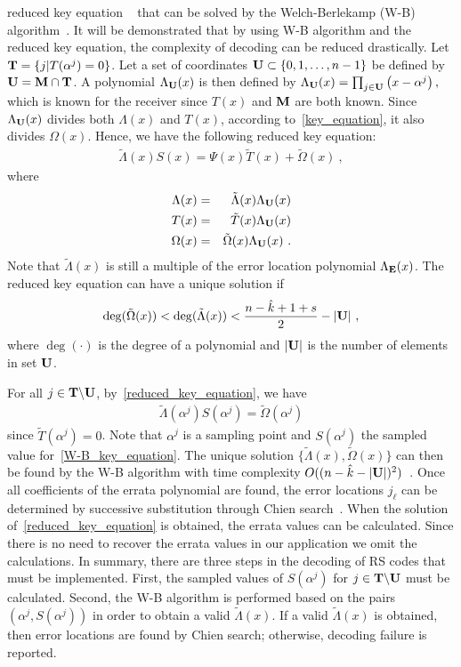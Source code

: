 \documentclass[10pt,journal,letterpaper,compsoc]{IEEEtran}
\newcommand{\0}{{\bf 0}}
\newcounter{step}
\begin{document}
reduced key equation ~\cite{ARA92} that can be solved by the Welch-Berlekamp
(W-B) algorithm~\cite{MOO05}. It will be demonstrated that by using W-B
algorithm and the reduced key equation, the complexity of decoding can be reduced drastically. Let ${\bf T}=\{j|T(\alpha^j)=0\}$.  Let a set of
coordinates ${\bf U}\subset \{0,1,\ldots,n-1\}$ be defined by ${\bf U} ={\bf M}\cap {\bf T}$. A polynomial $\Lambda_{{\bf U}}(x)$ is then defined by
$\Lambda_{{\bf U}}(x)=\prod_{j\in {\bf U}}\left(x-\alpha^j\right),$ which is known for the
receiver since $T(x)$ and ${\bf M}$ are both known. Since $\Lambda_{\bf U}(x)$
divides both $\Lambda(x)$ and $T(x)$, according to~\eqref{key_equation}, it
also divides $\Omega(x)$. Hence, we have the following reduced key equation:
\begin{eqnarray}
\tilde\Lambda(x)S(x)=\Psi(x)\tilde{T}(x)+\tilde\Omega(x)~,\label{reduced_key_equation}
\end{eqnarray}
where
\begin{eqnarray*}
\Lambda(x)&=&\tilde\Lambda(x)\Lambda_{{\bf U}}(x)\\
T(x)&=&\tilde{T}(x)\Lambda_{{\bf U}}(x)\\
\Omega(x)&=&\tilde\Omega(x)\Lambda_{{\bf U}}(x)~.
\end{eqnarray*}
Note that $\tilde\Lambda(x)$ is still a multiple of the error location polynomial $\Lambda_{{\bf E}}(x)$. The reduced key equation can have a unique solution if
\begin{eqnarray}
\deg(\tilde\Omega(x))<\deg(\tilde\Lambda(x))<\frac{n-\hat{k}+1+s}{2}-|{\bf U}|~,\label{criterion}
\end{eqnarray}
where $\deg(\cdot)$ is the degree of a polynomial and $|{\bf U}|$ is the number of elements in set ${\bf U}$.

For all $j\in {\bf T}\backslash
{\bf U}$, by~\eqref{reduced_key_equation}, we have
\begin{eqnarray}\tilde\Lambda(\alpha^j)S(\alpha^j)=\tilde\Omega(\alpha^j)\label{W-B_key_equation}\end{eqnarray}
since $\tilde{T}(\alpha^j)=0$. Note that $\alpha^j$ is a sampling point and
$S(\alpha^j)$ the sampled value for~\eqref{W-B_key_equation}. The unique
solution $\{\tilde\Lambda(x),\tilde\Omega(x)\}$ can then be found by the W-B
algorithm with time complexity $O((n-\hat{k}-|{\bf U}|)^2)$~\cite{MOO05}.  Once all
coefficients of the errata polynomial are found, the error locations $j_\ell$
can be determined by successive substitution through Chien search~\cite{LIN04}.
When the solution of~\eqref{reduced_key_equation} is obtained, the errata
values can be calculated. Since there is no need to recover the errata values in our application
we omit the calculations. In summary, there are three steps in the
decoding of RS codes that must be implemented. First, the sampled values of
$S(\alpha^j)$ for $j\in {\bf T}\backslash {\bf U}$ must be calculated. Second, the W-B
algorithm is performed based on the pairs $\left(\alpha^j, S(\alpha^j)\right)$
in order to obtain a valid $\tilde\Lambda(x)$. If a valid $\tilde\Lambda(x)$ is
obtained, then error locations are found by Chien search; otherwise, decoding
failure is reported. 
\end{document}
